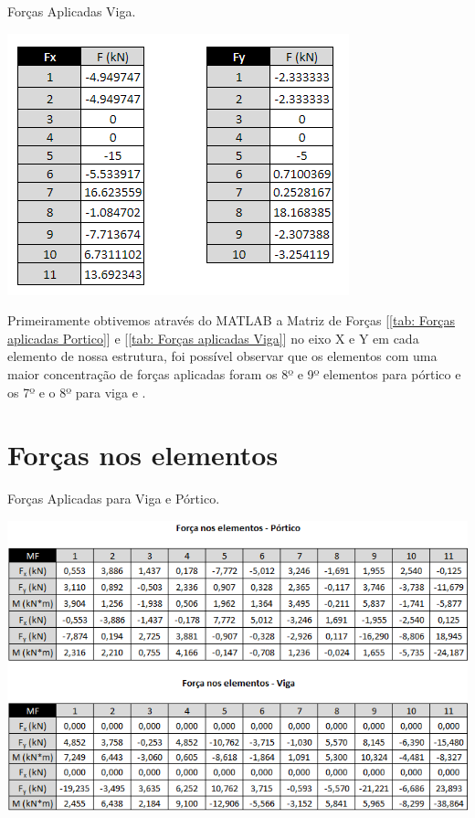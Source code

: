 \documentclass[deposito, acronym, symbols]{fei}
\begin{document}
\begin{table}[!htb]
 \centering
    \caption{Forças Aplicadas Viga.}
    \includegraphics[width=0.6\linewidth]{Tabelas/4Forças Aplicadas (V).png}
    \label{tab: Forças aplicadas Viga}
 \end{table}
 
Primeiramente obtivemos através do MATLAB a Matriz de Forças [\ref{tab: Forças aplicadas Portico}] e [\ref{tab: Forças aplicadas Viga}] no eixo X e Y em cada elemento de nossa estrutura, foi possível observar que os elementos com uma maior concentração de forças aplicadas foram os 8º e 9º elementos para pórtico e os 7º e o 8º para viga e .

\section{Forças nos elementos}

\begin{table}[!htb]
 \centering
    \caption{Forças Aplicadas para Viga e Pórtico.}
    \includegraphics[width=1\linewidth]{Tabelas/TabelaForças.png}
    \label{tab: Forças nos elementos}
\end{table}
\end{document}
